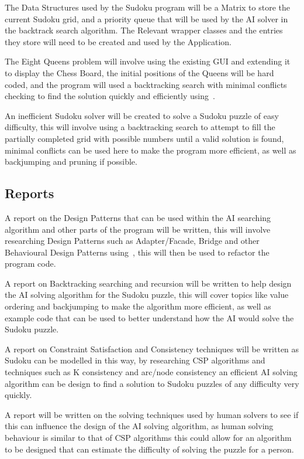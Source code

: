 \documentclass[]{final_report}
\begin{document}
The Data Structures used by the Sudoku program will be a Matrix to store the current Sudoku grid, and a priority queue that will be used by the AI solver in the backtrack search algorithm. The Relevant wrapper classes and the entries they store will need to be created and used by the Application.

The Eight Queens problem will involve using the existing GUI and extending it to display the Chess Board, the initial positions of the Queens will be hard coded, and the program will used a backtracking search with minimal conflicts checking to find the solution quickly and efficiently using~\cite{TSANG:1993}.

An inefficient Sudoku solver will be created to solve a Sudoku puzzle of easy difficulty, this will involve using a backtracking search to attempt to fill the partially completed grid with possible numbers until a valid solution is found, minimal conflicts can be used here to make the program more efficient, as well as backjumping and pruning if possible.

\subsection*{Reports}

A report on the Design Patterns that can be used within the AI searching algorithm and other parts of the program will be written, this will involve researching Design Patterns such as Adapter/Facade, Bridge and other Behavioural Design Patterns using~\cite{GAMMA:1995}, this will then be used to refactor the program code.

A report on Backtracking searching and recursion will be written to help design the AI solving algorithm for the Sudoku puzzle, this will cover topics like value ordering and backjumping to make the algorithm more efficient, as well as example code that can be used to better understand how the AI would solve the Sudoku puzzle.

A report on Constraint Satisfaction and Consistency techniques will be written as Sudoku can be modelled in this way, by researching CSP algorithms and techniques such as K consistency and arc/node consistency an efficient AI solving algorithm can be design to find a solution to Sudoku puzzles of any difficulty very quickly.

A report will be written on the solving techniques used by human solvers to see if this can influence the design of the AI solving algorithm, as human solving behaviour is similar to that of CSP algorithms this could allow for an algorithm to be designed that can estimate the difficulty of solving the puzzle for a person.
\end{document}
